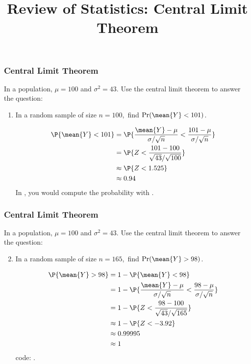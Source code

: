 \title[Probability]{Review of Statistics: Central Limit Theorem}
\date{}







\def\ask{In a population, $\mu=100$ and $\sigma^2=43$. Use the central limit theorem to answer the question:}


\begin{frame}
\frametitle{Central Limit Theorem}
\ask
\begin{enumerate}\setcounter{enumi}{0}

\item In a random sample of size $n=100$,\, find $\text{Pr}(\mean{Y}<101)$.

\begin{answer}
\begin{align*}
\P{\mean{Y} < 101}
  & = \P{\frac{\mean{Y}-\mu}{\sigma/\sqrt{n}} < \frac{101-\mu}{\sigma/\sqrt{n}}}\\
  & = \P{Z < \frac{101-100}{\sqrt{43}/\sqrt{100}}}\\  
  & \approx \P{Z < 1.525}\\ 
  & \approx 0.94
\end{align*}
In \Rlang, you would compute the probability with .
\end{answer}

\end{enumerate}
\end{frame}


\begin{frame}
\frametitle{Central Limit Theorem}
\ask
\begin{enumerate}\setcounter{enumi}{1}

\item In a random sample of size $n=165$,\, find $\text{Pr}(\mean{Y}>98)$.

\begin{answer}
\begin{align*}
\P{\mean{Y} > 98}
  & = 1 - \P{\mean{Y} < 98}\\
  & = 1 - \P{\frac{\mean{Y}-\mu}{\sigma/\sqrt{n}} < \frac{98-\mu}{\sigma/\sqrt{n}}}\\
  & = 1 - \P{Z < \frac{98-100}{\sqrt{43}/\sqrt{165}}}\\  
  & \approx 1 - \P{Z < -3.92}\\  
  & \approx 0.99995\\
  & \approx 1
\end{align*}
\Rlang code: .
\end{answer}

\end{enumerate}
\end{frame}


